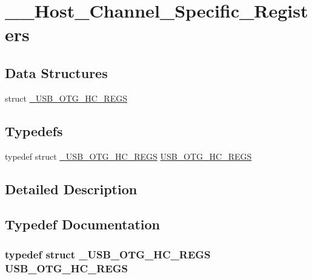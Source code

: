 \hypertarget{group_______host___channel___specific___registers}{\section{\-\_\-\-\_\-\-Host\-\_\-\-Channel\-\_\-\-Specific\-\_\-\-Registers}
\label{group_______host___channel___specific___registers}
}
\subsection*{Data Structures}
\begin{DoxyCompactItemize}
\item 
struct \hyperlink{struct___u_s_b___o_t_g___h_c___r_e_g_s}{\-\_\-\-U\-S\-B\-\_\-\-O\-T\-G\-\_\-\-H\-C\-\_\-\-R\-E\-G\-S}
\end{DoxyCompactItemize}
\subsection*{Typedefs}
\begin{DoxyCompactItemize}
\item 
typedef struct \hyperlink{struct___u_s_b___o_t_g___h_c___r_e_g_s}{\-\_\-\-U\-S\-B\-\_\-\-O\-T\-G\-\_\-\-H\-C\-\_\-\-R\-E\-G\-S} \hyperlink{group_______host___channel___specific___registers_ga1b123aa3d1b9476eab8957c17af482b0}{U\-S\-B\-\_\-\-O\-T\-G\-\_\-\-H\-C\-\_\-\-R\-E\-G\-S}
\end{DoxyCompactItemize}


\subsection{Detailed Description}


\subsection{Typedef Documentation}
\hypertarget{group_______host___channel___specific___registers_ga1b123aa3d1b9476eab8957c17af482b0}{
\subsubsection[{U\-S\-B\-\_\-\-O\-T\-G\-\_\-\-H\-C\-\_\-\-R\-E\-G\-S}]{\setlength{\rightskip}{0pt plus 5cm}typedef struct {\bf \-\_\-\-U\-S\-B\-\_\-\-O\-T\-G\-\_\-\-H\-C\-\_\-\-R\-E\-G\-S}
 {\bf U\-S\-B\-\_\-\-O\-T\-G\-\_\-\-H\-C\-\_\-\-R\-E\-G\-S}}}\label{group_______host___channel___specific___registers_ga1b123aa3d1b9476eab8957c17af482b0}
